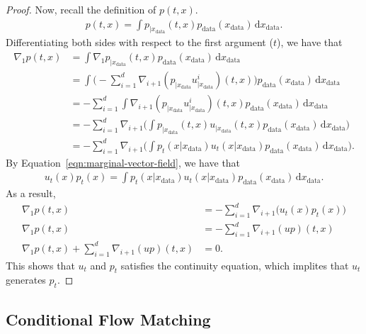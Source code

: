 \documentclass[10pt]{article}
\newcommand{\dee}{\mathrm{d}}
\newcommand{\data}{\mathrm{data}}
\begin{document}
\begin{itemize}
\begin{proof}
    Now, recall the definition of $p(t,x)$.
    \begin{align*}
      p(t,x) = \int p_{|x_{\data}}(t,x) p_{\data}(x_{\data})\, \dee x_{\data}.
    \end{align*}
    Differentiating both sides with respect to the first argument ($t$), we have that
    \begin{align*}
      \nabla_1 p(t,x) 
      &= \int \nabla_1 p_{|x_{\data}}(t,x) p_{\data}(x_{\data})\, \dee x_{\data} \\
      &= \int \bigg( -\sum_{i=1}^d \nabla_{i+1} (p_{|x_{\data}}u^i_{|x_{\data}})(t,x) \bigg) p_{\data}(x_{\data})\, \dee x_{\data} \\
      &= -\sum_{i=1}^d \int \nabla_{i+1} (p_{|x_{\data}}u^i_{|x_{\data}})(t,x) p_{\data}(x_{\data})\, \dee x_{\data} \\
      &= -\sum_{i=1}^d \nabla_{i+1} \bigg( \int  p_{|x_{\data}}(t,x) u_{|x_{\data}}(t,x) p_{\data}(x_{\data})\, \dee x_{\data}\bigg) \\
      &= -\sum_{i=1}^d \nabla_{i+1} \bigg( \int  p_t(x|x_{\data}) u_t(x|x_{\data}) p_{\data}(x_{\data})\, \dee x_{\data}\bigg).
    \end{align*}
    By Equation~\eqref{eqn:marginal-vector-field}, we have that
    \begin{align*}
      u_t(x) p_t(x) = \int p_t(x|x_{\data}) u_t(x|x_{\data}) p_{\data}(x_{\data})\, \dee x_{\data}.
    \end{align*}
    As a result,
    \begin{align*}
      \nabla_1 p(t,x) &= -\sum_{i=1}^d \nabla_{i+1} \big( u_t(x) p_t(x) \big) \\
      \nabla_1 p(t,x) &= -\sum_{i=1}^d \nabla_{i+1} (u p)(t,x) \\
      \nabla_1 p(t,x) + \sum_{i=1}^d \nabla_{i+1} (u p)(t,x) &= 0.
    \end{align*}
    This shows that $u_t$ and $p_t$ satisfies the continuity equation, which implites that $u_t$ generates $p_t$.
  \end{proof}
\end{itemize}

\subsection{Conditional Flow Matching}
\end{document}
